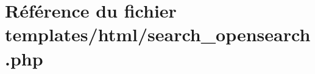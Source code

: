 \hypertarget{search__opensearch_8php}{}\section{Référence du fichier templates/html/search\+\_\+opensearch.php}
\label{search__opensearch_8php}
